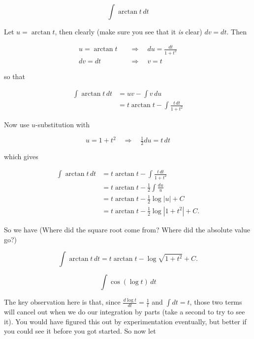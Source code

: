 \documentclass[12pt, letterpaper]{article}
\begin{document}
$$ \int \arctan{t} \, dt $$

Let $u = \arctan{t}$, then clearly (make sure you see that it \emph{is} clear) $dv = dt.$ Then

\begin{equation*}
\begin{aligned}
u = \arctan{t} \quad &\Rightarrow\quad du = \frac{dt}{1 + t^2} \\
dv = dt \quad &\Rightarrow\quad v = t
\end{aligned}
\end{equation*}

so that

\begin{equation*}
\begin{aligned}
\int \arctan{t} \, dt
  &= uv - \int v \, du \\[0.2in]
  &= t \arctan{t} - \int \frac{t \, dt}{1 + t^2}
\end{aligned}
\end{equation*}

Now use $u$-substitution with

$$ u = 1 + t^2 \quad \Rightarrow \quad \tfrac{1}{2}du = t \, dt $$

which gives

\begin{equation*}
\begin{aligned}
\int \arctan{t} \, dt
  &= t \arctan{t} - \int \frac{t \, dt}{1 + t^2} \\[0.2in]
  &= t \arctan{t} - \tfrac{1}{2} \int \frac{du}{u} \\[0.2in]
  &= t \arctan{t} - \tfrac{1}{2} \log{|u|} + C \\[0.2in]
  &= t \arctan{t} - \tfrac{1}{2} \log{|1 + t^2|} + C.
\end{aligned}
\end{equation*}

So we have (Where did the square root come from? Where did the absolute value go?)

\begin{equation*}
\boxed{
\int \arctan{t} \, dt
  = t \arctan{t} - \log{\sqrt{1 + t^2}} + C.
}
\end{equation*}

\newpage

$$ \int \cos{\left(\log{t}\right)} \, dt $$

The key observation here is that, since $\frac{d \log{t}}{dt} = \frac{1}{t}$ and $\int dt = t$, those two terms will cancel out when we do our integration by parts (take a second to try to see it). You would have figured this out by experimentation eventually, but better if you could see it before you got started. So now let
\end{document}
